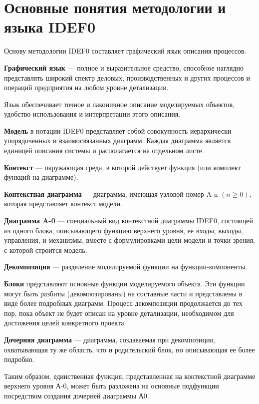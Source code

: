\documentclass[a4paper, final]{article}
\begin{document}
\newpage
\section{Основные понятия методологии и языка IDEF0}
Основу методологии IDEF0 составляет графический язык описания процессов.

{\bf Графический язык} --- полное и выразительное средство, способное наглядно представлять широкий спектр деловых, 
производственных и других процессов и операций предприятия на любом уровне детализации.

Язык обеспечивает точное и лаконичное описание моделируемых объектов, удобство использования и интерпретации этого описания.

{\bf Модель} в нотации IDEF0 представляет собой совокупность иерархически упорядоченных и взаимосвязанных диаграмм. 
Каждая диаграмма является единицей описания системы и располагается на отдельном листе.

{\bf Контекст} --- окружающая среда, в которой действует функция (или комплект функций на диаграмме).

{\bf Контекстная диаграмма} --- диаграмма, имеющая узловой номер A-n $( n\ge 0 )$, которая представляет контекст модели.

{\bf Диаграмма A-0} --- специальный вид контекстной диаграммы IDEF0, состоящей из одного блока, описывающего функцию 
верхнего уровня, ее входы, выходы, управления, и механизмы, вместе с формулировками цели модели и точки зрения, 
с которой строится модель. \cite{bib:gost_idef0}

{\bf Декомпозиция} ---  разделение моделируемой функции на функции-компоненты.

{\bf Блоки} представляют основные функции моделируемого объекта. Эти функции могут быть разбиты (декомпозированы) 
на составные части и представлены в виде более подробных диаграмм. Процесс декомпозиции продолжается до тех пор, пока 
объект не будет описан на уровне детализации, необходимом для достижения целей конкретного проекта. 

{\bf Дочерняя диаграмма} --- диаграмма, создаваемая при декомпозиции, охватывающая ту же область, что и родительский блок, 
но описывающая ее более подробно.

Таким образом, единственная функция, представленная на контекстной диаграмме верхнего уровня А-0, 
может быть разложена на основные подфункции посредством создания дочерней диаграммы А0.
\end{document}
